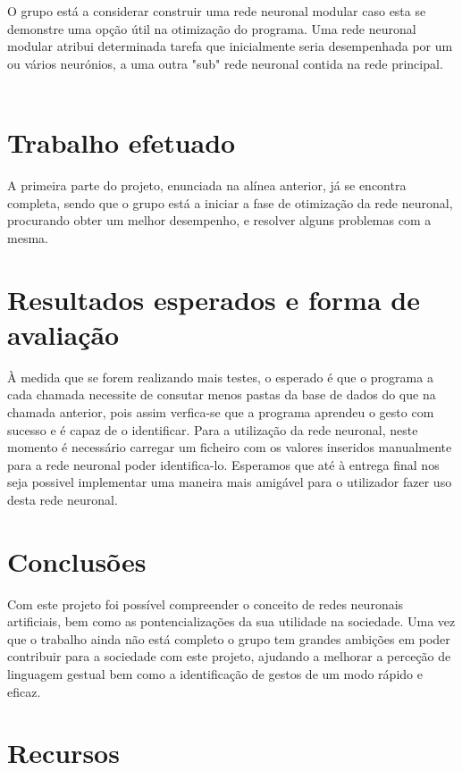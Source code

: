 \documentclass[10pt,a4paper]{article}
\begin{document}
O grupo está a considerar construir uma rede neuronal modular caso esta se demonstre uma opção útil na otimização do programa. Uma rede neuronal modular atribui determinada tarefa que inicialmente seria desempenhada por um ou vários neurónios, a uma outra "sub" rede neuronal contida na rede principal.
\\ \\

\section{Trabalho efetuado}
\subitem

A primeira parte do projeto, enunciada na alínea anterior, já se encontra completa, sendo que o grupo está a iniciar a fase de otimização da rede neuronal, procurando obter um melhor desempenho, e resolver alguns problemas com a mesma.


\section{Resultados esperados e forma de avaliação}
\subitem

À medida que se forem realizando mais testes, o esperado é que o programa a cada chamada necessite de consutar menos pastas da base de dados do que na chamada anterior, pois assim verfica-se que a programa aprendeu o gesto com sucesso e é capaz de o identificar.
Para a utilização da rede neuronal, neste momento é necessário carregar um ficheiro com os valores inseridos manualmente para a rede neuronal poder identifica-lo. Esperamos que até à entrega final nos seja possivel implementar uma maneira mais amigável para o utilizador fazer uso desta rede neuronal.

\section{Conclusões}
\subitem

Com este projeto foi possível compreender o conceito de redes neuronais artificiais, bem como as pontencializações da sua utilidade na sociedade. Uma vez que o trabalho ainda não está completo o grupo tem grandes ambições em poder contribuir para a sociedade com este projeto, ajudando a melhorar a perceção de linguagem gestual bem como a identificação de gestos de um modo rápido e eficaz.

\section{Recursos}
\end{document}
